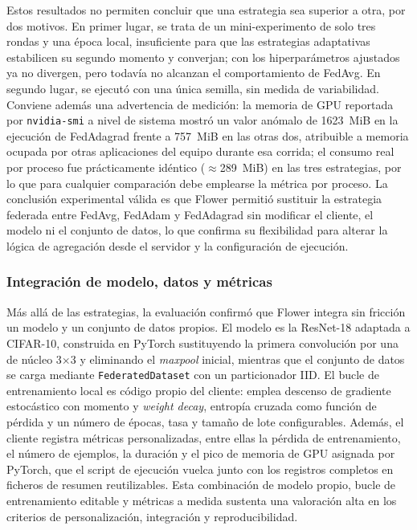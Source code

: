 Estos resultados no permiten concluir que una estrategia sea superior a otra, por
dos motivos. En primer lugar, se trata de un mini-experimento de solo tres rondas
y una época local, insuficiente para que las estrategias adaptativas estabilicen
su segundo momento y converjan; con los hiperparámetros ajustados ya no divergen,
pero todavía no alcanzan el comportamiento de FedAvg. En segundo lugar, se ejecutó
con una única semilla, sin medida de variabilidad. Conviene además una
advertencia de medición: la memoria de GPU reportada por \texttt{nvidia-smi} a
nivel de sistema mostró un valor anómalo de 1623~MiB en la ejecución de
FedAdagrad frente a 757~MiB en las otras dos, atribuible a memoria ocupada por
otras aplicaciones del equipo durante esa corrida; el consumo real por proceso fue
prácticamente idéntico ($\approx$289~MiB) en las tres estrategias, por lo que para
cualquier comparación debe emplearse la métrica por proceso. La conclusión
experimental válida es que Flower permitió sustituir la estrategia federada entre
FedAvg, FedAdam y FedAdagrad sin modificar el cliente, el modelo ni el conjunto de
datos, lo que confirma su flexibilidad para alterar la lógica de agregación desde el
servidor y la configuración de ejecución.

\subsubsection{Integración de modelo, datos y métricas}\label{subsec:flex-flower-integracion}

Más allá de las estrategias, la evaluación confirmó que Flower integra sin
fricción un modelo y un conjunto de datos propios. El modelo es la ResNet-18
adaptada a CIFAR-10, construida en PyTorch sustituyendo la primera convolución por
una de núcleo 3$\times$3 y eliminando el \textit{maxpool} inicial, mientras que el
conjunto de datos se carga mediante \texttt{FederatedDataset} con un
particionador IID. El bucle de entrenamiento local es código propio del cliente:
emplea descenso de gradiente estocástico con momento y \textit{weight decay},
entropía cruzada como función de pérdida y un número de épocas, tasa y tamaño de
lote configurables. Además, el cliente registra métricas personalizadas, entre
ellas la pérdida de entrenamiento, el número de ejemplos, la duración y el pico de
memoria de GPU asignada por PyTorch, que el script de ejecución vuelca junto con
los registros completos en ficheros de resumen reutilizables. Esta combinación de
modelo propio, bucle de entrenamiento editable y métricas a medida sustenta una
valoración alta en los criterios de personalización, integración y
reproducibilidad.

